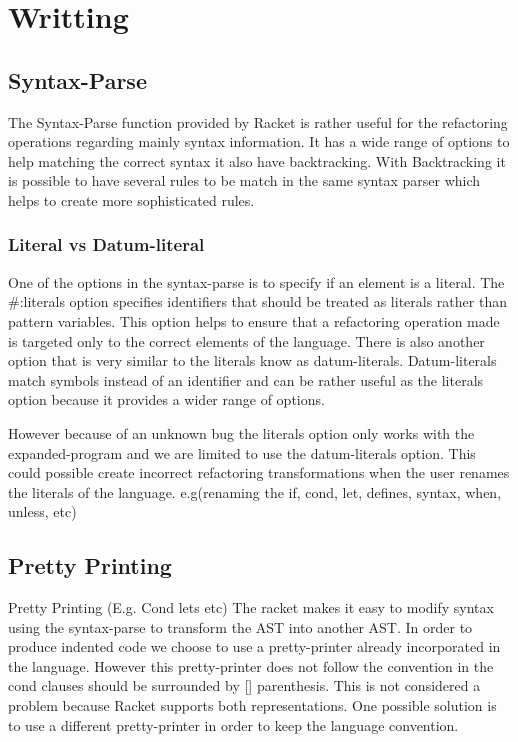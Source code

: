 \section{Writting}
\subsection{Syntax-Parse}
The Syntax-Parse function provided by Racket is rather useful for the refactoring
operations regarding mainly syntax information.
It has a wide range of options to help matching the correct syntax it also have
backtracking. With Backtracking it is possible to have several rules to be match
in the same syntax parser which helps to create more sophisticated rules.

\subsubsection{Literal vs Datum-literal}
One of the options in the syntax-parse is to specify if an element is a literal.
The \#:literals option specifies identifiers that should be treated as literals
rather than pattern variables. This option helps to ensure that a refactoring
operation made is targeted only to the correct elements of the language. There is
also another option that is very similar to the literals know as datum-literals.
Datum-literals match symbols instead of an identifier and can be rather useful as
the literals option because it provides a wider range of options.

However because of an unknown bug the literals option only works with the expanded-program
and we are limited to use the datum-literals option. This could possible create
incorrect refactoring transformations when the user renames the literals of the
language. e.g(renaming the if, cond, let, defines, syntax, when, unless, etc)

\subsection{Pretty Printing}

Pretty Printing (E.g. Cond lets etc)
The racket makes it easy to modify syntax using the syntax-parse to transform the
AST into another AST.
In order to produce indented code we choose to use a pretty-printer already
incorporated in the language.
However this pretty-printer does not follow the convention in the cond clauses
should be surrounded by [] parenthesis. This is not considered a problem because
Racket supports both representations.
One possible solution is to use a different pretty-printer in
order to keep the language convention.



